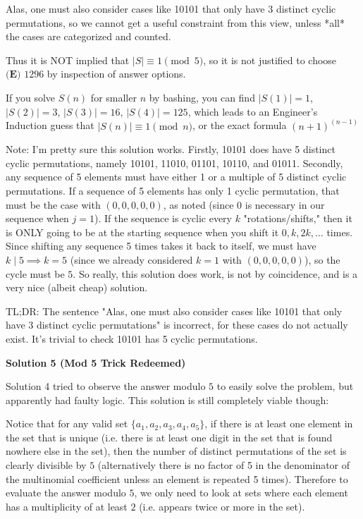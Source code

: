\begin{enumerate}
 Alas, one must also consider cases like 10101 that only have 3 distinct cyclic permutations, so we cannot get a useful constraint from this view, unless *all* the cases are categorized and counted. 

 Thus it is NOT implied that $\lvert S \rvert \equiv 1  \pmod 5$, so it is not justified to choose $\boxed{\textbf{(E) }1296}$ by inspection of answer options.

 If you solve $S(n)$ for smaller $n$ by bashing, you can find $|S(1)| =1$, $|S(2)| = 3$, $|S(3)| =16$, $|S(4)| =125$, which leads to an Engineer's Induction guess that $|S(n)| \equiv 1 \pmod n$, or the exact formula $(n+1)^{(n-1)}$

 Note: I'm pretty sure this solution works. Firstly, 10101 does have 5 distinct cyclic permutations, namely 10101, 11010, 01101, 10110, and 01011. Secondly, any sequence of 5 elements must have either 1 or a multiple of 5 distinct cyclic permutations. If a sequence of 5 elements has only 1 cyclic permutation, that must be the case with $(0, 0, 0, 0, 0)$, as noted (since 0 is necessary in our sequence when $j = 1$). If the sequence is cyclic every $k$ "rotations/shifts," then it is ONLY going to be at the starting sequence when you shift it $0, k, 2k, \dots$ times. Since shifting any sequence 5 times takes it back to itself, we must have $k \mid 5 \implies k = 5$ (since we already considered $k = 1$ with $(0, 0, 0, 0, 0)$), so the cycle must be $5$. So really, this solution does work, is not by coincidence, and is a very nice (albeit cheap) solution.

 TL;DR: The sentence "Alas, one must also consider cases like 10101 that only have 3 distinct cyclic permutations" is incorrect, for these cases do not actually exist. It's trivial to check 10101 has 5 cyclic permutations.

 



\textbf{Solution 5 (Mod 5 Trick Redeemed)}

Solution 4 tried to observe the answer modulo $5$ to easily solve the problem, but apparently had faulty logic. This solution is still completely viable though:

 Notice that for any valid set $\{a_1, a_2, a_3, a_4, a_5\}$, if there is at least one element in the set that is unique (i.e. there is at least one digit in the set that is found nowhere else in the set), then the number of distinct permutations of the set is clearly divisible by $5$ (alternatively there is no factor of 5 in the denominator of the multinomial coefficient unless an element is repeated 5 times). Therefore to evaluate the answer modulo $5$, we only need to look at sets where each element has a multiplicity of at least $2$ (i.e. appears twice or more in the set). 


\end{enumerate}

